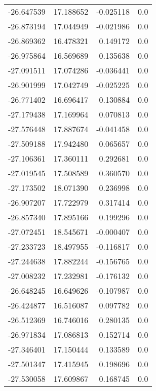 \begin{tabular}{rrrr}
      -26.647539 &        17.188652 &   -0.025118 &   0.0 \\
      -26.873194 &        17.044949 &   -0.021986 &   0.0 \\
      -26.869362 &        16.478321 &    0.149172 &   0.0 \\
      -26.975864 &        16.569689 &    0.135638 &   0.0 \\
      -27.091511 &        17.074286 &   -0.036441 &   0.0 \\
      -26.901999 &        17.042749 &   -0.025225 &   0.0 \\
      -26.771402 &        16.696417 &    0.130884 &   0.0 \\
      -27.179438 &        17.169964 &    0.070813 &   0.0 \\
      -27.576448 &        17.887674 &   -0.041458 &   0.0 \\
      -27.509188 &        17.942480 &    0.065657 &   0.0 \\
      -27.106361 &        17.360111 &    0.292681 &   0.0 \\
      -27.019545 &        17.508589 &    0.360570 &   0.0 \\
      -27.173502 &        18.071390 &    0.236998 &   0.0 \\
      -26.907207 &        17.722979 &    0.317414 &   0.0 \\
      -26.857340 &        17.895166 &    0.199296 &   0.0 \\
      -27.072451 &        18.545671 &   -0.000407 &   0.0 \\
      -27.233723 &        18.497955 &   -0.116817 &   0.0 \\
      -27.244638 &        17.882244 &   -0.156765 &   0.0 \\
      -27.008232 &        17.232981 &   -0.176132 &   0.0 \\
      -26.648245 &        16.649626 &   -0.107987 &   0.0 \\
      -26.424877 &        16.516087 &    0.097782 &   0.0 \\
      -26.512369 &        16.746016 &    0.280135 &   0.0 \\
      -26.971834 &        17.086813 &    0.152714 &   0.0 \\
      -27.346401 &        17.150444 &    0.133589 &   0.0 \\
      -27.501347 &        17.415945 &    0.198696 &   0.0 \\
      -27.530058 &        17.609867 &    0.168745 &   0.0 \\

\end{tabular}
